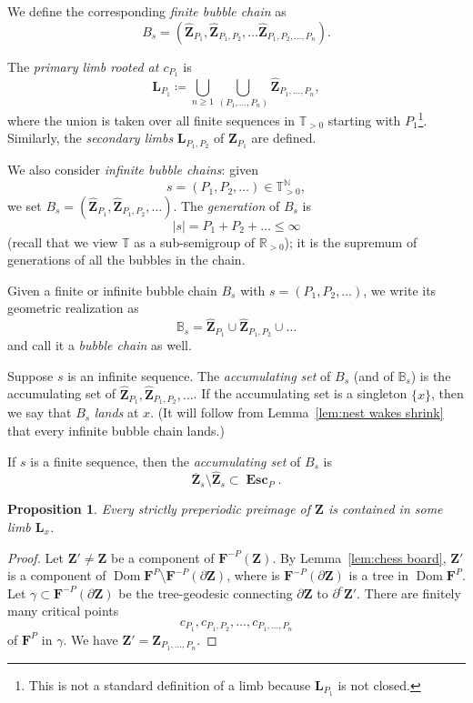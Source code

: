 \documentclass{amsart}
\newcommand{\Dom}{\operatorname {Dom}}
\newcommand{\1}{{\mathbb 1 }}
\newcommand\PT{\mathbb{ T}}
\newcommand{\bB}{{\mathbb{B}}}
\newcommand{\bF}{{\mathbf F}}
\newcommand{\bZ}{{\mathbf Z}}
\newcommand{\bL}{{\mathbf L}}
\newcommand{\R}{\mathbb{R}}
\newcommand{\N}{\mathbb{N}}
\newtheorem{prop}[thm]{Proposition}
\theoremstyle{remark}
\numberwithin{equation}{section}
\theoremstyle{definition}
\newcommand{\Esc}{{\boldsymbol{\operatorname{Esc}}}}
\theoremstyle{nonumberbreak}
\begin{document}
 We define the corresponding \emph{finite bubble chain} as \[B_s=(\widehat \bZ_{P_1},\widehat \bZ_{P_1,P_2},\dots\widehat \bZ_{P_1,P_2,\dots , P_n}).\]


The \emph{primary limb rooted at $c_{P_1}$} is
\[\bL_{P_1}\coloneqq \bigcup _{n\ge 1}\bigcup_{(P_1,\dots , P_n)}\widehat \bZ_{P_1,\dots , P_n},\]
where the union is taken over all finite sequences in $\PT_{>0}$ starting with $P_1$\footnote{This is not a standard definition of a limb because $\bL_{P_1}$ is not closed.}. Similarly, the \emph{secondary limbs} $\bL_{P_1,P_2}$ of $\bZ_{P_1}$ are defined.   

  
We also consider \emph{infinite bubble chains}: given \[s=(P_1,P_2,\dots)\in \PT^{\N}_{>0},\] we set $B_s=(\widehat \bZ_{P_1},\widehat \bZ_{P_1,P_2},\dots)$. The \emph{generation} of $B_s$ is
 \[|s|=P_1+P_2+\dots \le \infty\]  
 (recall that we view $\PT$ as a sub-semigroup of $\R_{>0}$); it is the supremum of generations of all the bubbles in the chain.
 
 Given a finite or infinite bubble chain $B_s$ with $s=(P_1,P_2,\dots )$, we write its geometric realization as \[\bB_s=\widehat \bZ_{P_1}\cup\widehat\bZ_{P_1,P_2}\cup \dots  \]
 and call it a \emph{bubble chain} as well.

Suppose $s$ is an infinite sequence. The \emph{accumulating set} of $B_s$ (and of $\bB_s$) is the accumulating set of $\widehat \bZ_{P_1}, \widehat \bZ_{P_1,P_2},\dots$. If the accumulating set is a singleton $\{x\}$, then we say that $B_s$ \emph{lands} at $x$. (It will follow from Lemma~\ref{lem:nest wakes shrink} that every infinite bubble chain lands.)

If $s$ is a finite sequence, then the \emph{accumulating set} of $B_s$ is 
\begin{equation}
\label{eq:defn:accum set} 
\overline \bZ_{s}\setminus \widehat \bZ_s\subset \Esc_{P}.
\end{equation}


\begin{prop}
Every strictly preperiodic preimage of $\bZ$ is contained in some limb $\bL_x$.
\end{prop}
\begin{proof}
Let $\bZ'\not=\bZ$ be a component of $\bF^{-P}(\bZ)$. By Lemma~\ref{lem:chess board}, $\bZ'$ is a component of $\Dom \bF^P\setminus \bF^{-P}(\partial \bZ)$, where is $\bF^{-P}(\partial \bZ)$ is a tree in $\Dom \bF^P$. Let $\gamma\subset \bF^{-P}(\partial \bZ)$ be the tree-geodesic connecting $\partial \bZ$ to $\partial^c \bZ'$. There are finitely many  critical points \[c_{P_1},c_{P_1,P_2},\dots , c_{P_1,\dots, P_n}\] of $\bF^P$ in $\gamma$. We have $\bZ'=\bZ_{P_1,\dots, P_n}$.
\end{proof}
\end{document}
